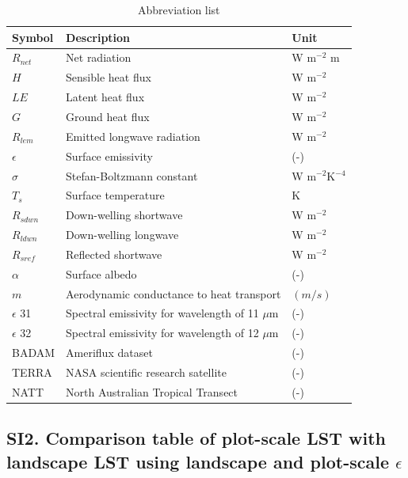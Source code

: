 \documentclass[fleqn,10pt]{wlscirep}
\begin{document}
{{\begin{table}[h!]
\centering
\caption{Abbreviation list}
\begin{tabular}{p{2.5cm} p{4.0cm} p{3.0cm}}

\hline

Symbol & Description & Unit\\

\hline
$R_{net}$ & Net radiation & W m$^{-2}$ m \\
$H$ & Sensible heat flux & W m$^{-2}$ \\
$LE$ & Latent heat flux & W m$^{-2}$ \\
$G$ & Ground heat flux & W m$^{-2}$ \\
$R_{lem}$ & Emitted longwave radiation & W m$^{-2}$ \\
$\epsilon$ & Surface emissivity & (-)\\
$\sigma$ & Stefan-Boltzmann constant & W m$^{-2}$K$^{-4}$\\
$T_{s}$ & Surface temperature & K\\
$R_{sdwn}$ & Down-welling shortwave & W m$^{-2}$\\
$R_{ldwn}$ & Down-welling longwave & W m$^{-2}$\\
$R_{sref}$ & Reflected shortwave & W m$^{-2}$\\
$\alpha$ & Surface albedo & (-)\\
$m$ & Aerodynamic conductance to heat transport & $(m/s)$\\
$\epsilon$ 31 & Spectral emissivity for wavelength of 11 $\mu$m & (-) \\
$\epsilon$ 32 & Spectral emissivity for wavelength of 12 $\mu$m & (-)  \\
BADAM & Ameriflux dataset & (-) \\
TERRA & NASA scientific research satellite & (-)  \\
NATT & North Australian Tropical Transect & (-) \\

\hline
\end{tabular}
\label{table:SI2}
\end{table}

\subsection*{SI2. Comparison table of plot-scale LST with landscape LST using landscape and plot-scale $\epsilon$}

}}
\end{document}

